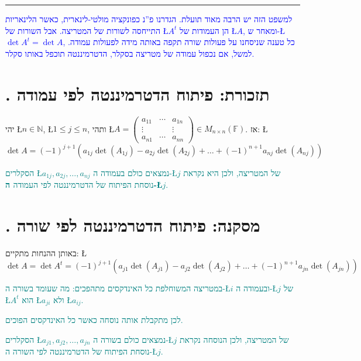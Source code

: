 \documentclass[english,hebrew]{article}
\begin{document}
\medskip{}

\rule[0.5ex]{1\columnwidth}{1pt}

\medskip{}

\textcolor{blue}{למשפט הזה יש הרבה מאוד תועלת. הגדרנו פ\textquotedblright נ
כפונקציה מולטי-לינארית, כאשר הלינאריות התייחסה לשורות של המטריצה.
אבל השורות של \L{$A^{t}$} הן העמודות של \L{$A$}, ומאחר ש-\L{$\det A^{t}=\det A$},
כל טענה שניסחנו על פעולות שורה תקפה באותה מידה לפעולות עמודה. למשל,
אם נכפול עמודה של מטריצה בסקלר, הדטרמיננטה תוכפל באותו סקלר.}

\section{{\endL}. תזכורת: פיתוח הדטרמיננטה לפי עמודה}

יהי \L{$n\in\mathbb{N}$}, \L{$1\le j\le n$}, ותהי \L{$A=\begin{pmatrix}a_{11} & \cdots & a_{1n}\\
\vdots &  & \vdots\\
a_{n1} & \cdots & a_{nn}
\end{pmatrix}\in M_{n\times n}(\mathbb{F})$}. אז: \L{%
\[
\det A=(-1)^{j+1}\left(a_{1j}\det(A_{1j})-a_{2j}\det(A_{2j})+\dots+(-1)^{n+1}a_{nj}\det(A_{nj})\right)
\]
}%

\textcolor{teal}{הסקלרים \L{$a_{1j},a_{2j},\dots,a_{nj}$} נמצאים
כולם בעמודה ה-\L{$j$} של המטריצה, ולכן היא נקראת נוסחת הפיתוח של
הדטרמיננטה לפי העמודה}\textbf{\textcolor{teal}{{} ה-\L{$j$}}}\textcolor{teal}{.}

\section{{\endL}. מסקנה: פיתוח הדטרמיננטה לפי שורה}

באותן ההנחות מתקיים: \L{%
\[
\det A=\det A^{t}=(-1)^{j+1}\left(a_{j1}\det(A_{j1})-a_{j2}\det(A_{j2})+\dots+(-1)^{n+1}a_{jn}\det(A_{jn})\right)
\]
}%

\textcolor{teal}{במטריצה המשוחלפת כל האינדקסים מתהפכים: מה שעומד בשורה
ה-\L{$i$} ובעמודה ה-\L{$j$} של \L{$A^{t}$} הוא \L{$a_{ji}$} ולא
\L{$a_{ij}$}. }

\textcolor{teal}{לכן מתקבלת אותה נוסחה כאשר כל האינדקסים הפוכים.}

\textcolor{teal}{הסקלרים \L{$a_{j1},a_{j2},\dots,a_{jn}$} נמצאים
כולם בשורה ה-\L{$j$} של המטריצה, ולכן הנוסחה נקראת נוסחת הפיתוח של
הדטרמיננטה לפי השורה ה-\L{$j$}.}

\medskip{}
\end{document}
